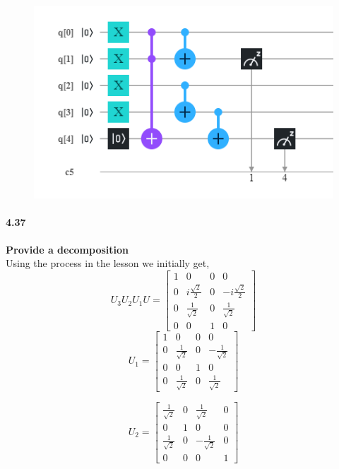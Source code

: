  \begin{figure}[h!]
     \centering
     \includegraphics{Chapter 4/4.36.png}
     
     \label{fig:my_label}
 \end{figure}


\paragraph{4.37} \textbf{Provide a decomposition}
\\

Using the process in the lesson we initially get,
$$U_3U_2U_1U = \begin{bmatrix}1 & 0 & 0 & 0 \\0 & i\frac{\sqrt{2}}{2} & 0 & -i\frac{\sqrt{2}}{2} \\0 & \frac{1}{\sqrt{2}} & 0 & \frac{1}{\sqrt{2}} \\0 & 0 & 1 & 0 \end{bmatrix}$$
$$U_1 = \begin{bmatrix}1 & 0 & 0 & 0 \\0 & \frac{1}{\sqrt{2}} & 0 & -\frac{1}{\sqrt{2}} \\0 & 0 & 1 & 0 \\0 & \frac{1}{\sqrt{2}} & 0 & \frac{1}{\sqrt{2}} \end{bmatrix}$$ 

$$U_2 = \begin{bmatrix} \frac{1}{\sqrt{2}}& 0 & \frac{1}{\sqrt{2}} & 0 \\
0 & 1 & 0 & 0 \\
\frac{1}{\sqrt{2}} & 0 & -\frac{1}{\sqrt{2}} & 0 \\
0 & 0 & 0 & 1 \end{bmatrix}$$ 


